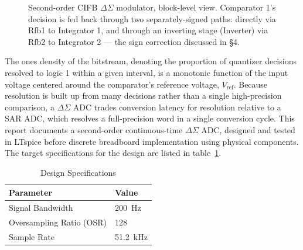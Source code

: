 \documentclass[12pt, a4paper]{article}
\begin{document}
\begin{figure}[htbp]
\caption{Second-order CIFB $\Delta\Sigma$ modulator, block-level view. Comparator 1's decision is fed back through two separately-signed paths: directly via Rfb1 to Integrator 1, and through an inverting stage (Inverter) via Rfb2 to Integrator 2 --- the sign correction discussed in \S4.}
\label{fig:block_diagram}
\end{figure}

The ones density of the bitstream, denoting the proportion of quantizer decisions resolved to logic 1 within a given interval, is a monotonic function of the input voltage centered around the comparator's reference voltage, $V_{\mathrm{ref}}$.
Because resolution is built up from many decisions rather than a single high-precision comparison, a $\Delta\Sigma$ ADC trades conversion latency for resolution relative to a SAR ADC, which resolves a full-precision word in a single conversion cycle.
This report documents a second-order continuous-time $\Delta \Sigma$ ADC, designed and tested in
LTspice before discrete breadboard implementation using physical components. The target specifications
for the design are listed in table~\ref{tab:specs}.

\begin{table}[H]
    \centering
    \caption{Design Specifications}
    \label{tab:specs}
    \begin{tabular}{@{}ll@{}}
        \toprule
        Parameter & Value \\
        \midrule
        Signal Bandwidth & \qty{200}{\hertz} \\
        Oversampling Ratio (OSR) & 128 \\
        Sample Rate & \qty{51.2}{\kilo\hertz} \\
        \bottomrule
    \end{tabular}
\end{table}
\end{document}
